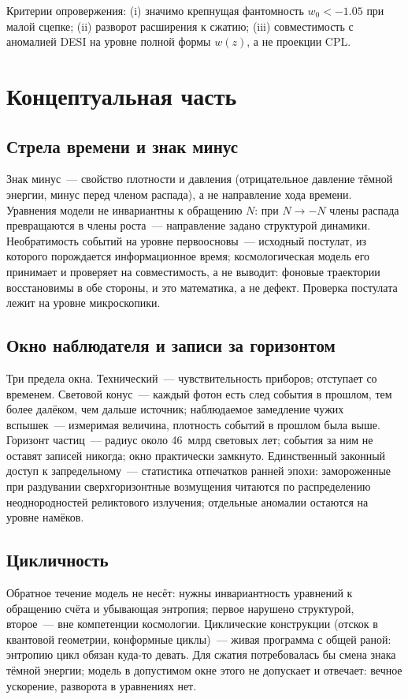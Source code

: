 \documentclass[11pt,a4paper]{article}
\begin{document}
Критерии опровержения: (i) значимо крепнущая фантомность $w_0<-1.05$ при малой сцепке; (ii) разворот расширения к сжатию; (iii) совместимость с аномалией DESI на уровне полной формы $w(z)$, а не проекции CPL.

\section{Концептуальная часть}

\subsection{Стрела времени и знак минус}
Знак минус~--- свойство плотности и давления (отрицательное давление тёмной энергии, минус перед членом распада), а не направление хода времени. Уравнения модели не инвариантны к обращению $N$: при $N\to-N$ члены распада превращаются в члены роста~--- направление задано структурой динамики. Необратимость событий на уровне первоосновы~--- исходный постулат, из которого порождается информационное время; космологическая модель его принимает и проверяет на совместимость, а не выводит: фоновые траектории восстановимы в обе стороны, и это математика, а не дефект. Проверка постулата лежит на уровне микроскопики.

\subsection{Окно наблюдателя и записи за горизонтом}
Три предела окна. Технический~--- чувствительность приборов; отступает со временем. Световой конус~--- каждый фотон есть след события в прошлом, тем более далёком, чем дальше источник; наблюдаемое замедление чужих вспышек~--- измеримая величина, плотность событий в прошлом была выше. Горизонт частиц~--- радиус около 46~млрд световых лет; события за ним не оставят записей никогда; окно практически замкнуто. Единственный законный доступ к запредельному~--- статистика отпечатков ранней эпохи: замороженные при раздувании сверхгоризонтные возмущения читаются по распределению неоднородностей реликтового излучения; отдельные аномалии остаются на уровне намёков.

\subsection{Цикличность}
Обратное течение модель не несёт: нужны инвариантность уравнений к обращению счёта и убывающая энтропия; первое нарушено структурой, второе~--- вне компетенции космологии. Циклические конструкции (отскок в квантовой геометрии, конформные циклы)~--- живая программа с общей раной: энтропию цикл обязан куда-то девать. Для сжатия потребовалась бы смена знака тёмной энергии; модель в допустимом окне этого не допускает и отвечает: вечное ускорение, разворота в уравнениях нет.
\end{document}
